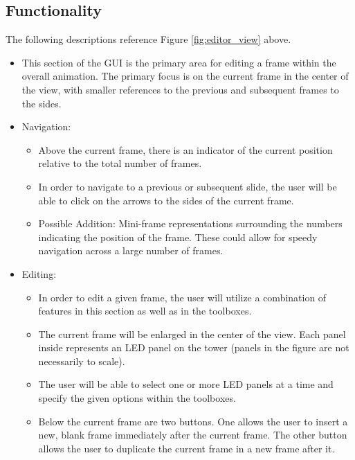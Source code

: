 	\subsection{Functionality}
	The following descriptions reference Figure \ref{fig:editor_view} above.
	\begin{itemize}
		\item This section of the GUI is the primary area for editing a frame within the overall animation. The primary focus is on the current frame in the center of the view, with smaller references to the previous and subsequent frames to the sides.
		\item Navigation:
		\begin{itemize}
			\item Above the current frame, there is an indicator of the current position relative to the total number of frames.
			\item In order to navigate to a previous or subsequent slide, the user will be able to click on the arrows to the sides of the current frame.
			\item Possible Addition: Mini-frame representations surrounding the numbers indicating the position of the frame. These could allow for speedy navigation across a large number of frames.
		\end{itemize}
		\item Editing:
		\begin{itemize}
			\item In order to edit a given frame, the user will utilize a combination of features in this section as well as in the toolboxes. %
			\item The current frame will be enlarged in the center of the view. Each panel inside represents an LED panel on the tower (panels in the figure are not necessarily to scale).
			\item The user will be able to select one or more LED panels at a time and specify the given options within the toolboxes.
			\item Below the current frame are two buttons. One allows the user to insert a new, blank frame immediately after the current frame. The other button allows the user to duplicate the current frame in a new frame after it.
		\end{itemize}
	\end{itemize}
	
